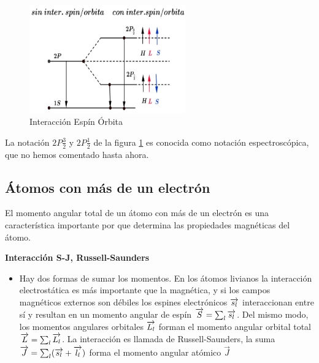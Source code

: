 \begin{figure}[H]
    \centering
    \includegraphics[width=0.6\textwidth]{./Figures/GraficoInterEspinOrbita}
	\caption{Interacción Espín Órbita}
	\label{fig:GraficoInterEspinOrbita}
\end{figure}

La notación $2P\frac{3}{2}$ y $2P\frac{1}{2}$ de la figura \ref{fig:GraficoInterEspinOrbita} es conocida como notación espectroscópica, que no hemos comentado hasta ahora.

\subsection{Átomos con más de un electrón}

El momento angular total de un átomo con más de un electrón es una característica importante por que determina las propiedades magnéticas del átomo.

\textbf{Interacción S-J, Russell-Saunders}
\begin{itemize}
	\item Hay dos formas de sumar los momentos. En los átomos livianos la interacción electrostática es más importante que la magnética, y si los campos magnéticos externos son débiles los espines electrónicos $\overrightarrow{s_{l}}$ interaccionan entre sí y resultan en un momento angular de espín $\overrightarrow{S}=\sum_{l}\overrightarrow{s_{l}}$. Del mismo modo, los momentos angulares orbitales $\overrightarrow{L_{l}}$ forman el momento angular orbital total $\overrightarrow{L}=\sum_{l}\overrightarrow{L_{l}}$. La interacción es llamada de Russell-Saunders, la suma $\overrightarrow{J}=\sum_{l}(\overrightarrow{s_{l}}+\overrightarrow{l_{l}})$ forma el momento angular atómico $\overrightarrow{J}$
\end{itemize}
 
